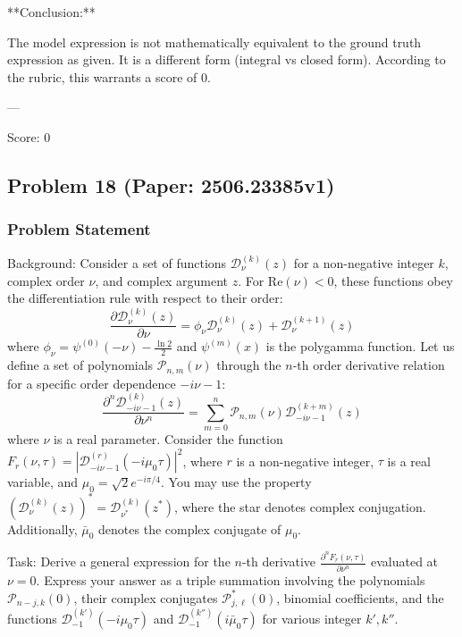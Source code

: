 \documentclass[10pt]{article}
\begin{document}
**Conclusion:**

The model expression is not mathematically equivalent to the ground truth expression as given. It is a different form (integral vs closed form). According to the rubric, this warrants a score of 0.

---

Score: 0

\newpage
\subsection*{Problem 18 (Paper: 2506.23385v1)}
\subsubsection*{Problem Statement}
Background:
Consider a set of functions $\mathcal{D}^{\left(k\right)}_{\nu}\left(z\right)$ for a non-negative integer $k$, complex order $\nu$, and complex argument $z$. For $\mathrm{Re}(\nu) < 0$, these functions obey the differentiation rule with respect to their order:
$$ \frac{\partial \mathcal{D}^{\left(k\right)}_{\nu}\left(z\right)}{\partial \nu}=\phi_{\nu}\mathcal{D}^{\left(k\right)}_{\nu}\left(z\right)+\mathcal{D}^{\left(k+1\right)}_{\nu}\left(z\right) $$
where $\phi_{\nu}=\psi^{\left(0\right)}\left(-\nu\right)-\frac{\ln 2}{2}$ and $\psi^{(m)}(x)$ is the polygamma function. Let us define a set of polynomials $\mathcal{P}_{n,m}(\nu)$ through the $n$-th order derivative relation for a specific order dependence $-i\nu-1$:
$$ \frac{\partial^n \mathcal{D}^{\left(k\right)}_{-i\nu-1}\left(z\right)}{\partial \nu^n}=\sum_{m=0}^{n}\mathcal{P}_{n,m}\left(\nu\right)\mathcal{D}^{\left(k+m\right)}_{-i\nu-1}\left(z\right) $$
where $\nu$ is a real parameter. Consider the function $F_{r}(\nu, \tau) = \left|\mathcal{D}^{\left(r\right)}_{-i\nu-1}\left(-i\mu_0\tau\right)\right|^2$, where $r$ is a non-negative integer, $\tau$ is a real variable, and $\mu_0 = \sqrt{2}e^{-i\pi/4}$. You may use the property $\left(\mathcal{D}^{(k)}_{\nu}(z)\right)^* = \mathcal{D}^{(k)}_{\nu^*}(z^*)$, where the star denotes complex conjugation. Additionally, $\bar{\mu}_0$ denotes the complex conjugate of $\mu_0$.

Task:
Derive a general expression for the $n$-th derivative $\frac{\partial^n F_{r}(\nu, \tau)}{\partial \nu^n}$ evaluated at $\nu=0$. Express your answer as a triple summation involving the polynomials $\mathcal{P}_{n-j,k}(0)$, their complex conjugates $\mathcal{P}^*_{j,\ell}(0)$, binomial coefficients, and the functions $\mathcal{D}^{(k')}_{-1}(-i\mu_0\tau)$ and $\mathcal{D}^{(k'')}_{-1}(i\bar{\mu}_0\tau)$ for various integer $k', k''$.
\end{document}
